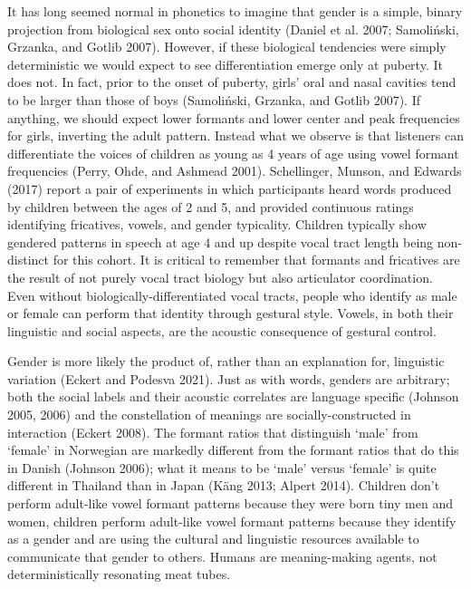 \documentclass[
  letterpaper,
  DIV=11,
  numbers=noendperiod]{scrartcl}
\begin{document}
It has long seemed normal in phonetics to imagine that gender is a
simple, binary projection from biological sex onto social identity
(Daniel et al. 2007; Samoliński, Grzanka, and Gotlib 2007). However, if
these biological tendencies were simply deterministic we would expect to
see differentiation emerge only at puberty. It does not. In fact, prior
to the onset of puberty, girls' oral and nasal cavities tend to be
larger than those of boys (Samoliński, Grzanka, and Gotlib 2007). If
anything, we should expect lower formants and lower center and peak
frequencies for girls, inverting the adult pattern. Instead what we
observe is that listeners can differentiate the voices of children as
young as 4 years of age using vowel formant frequencies (Perry, Ohde,
and Ashmead 2001). Schellinger, Munson, and Edwards (2017) report a pair
of experiments in which participants heard words produced by children
between the ages of 2 and 5, and provided continuous ratings identifying
fricatives, vowels, and gender typicality. Children typically show
gendered patterns in speech at age 4 and up despite vocal tract length
being non-distinct for this cohort. It is critical to remember that
formants and fricatives are the result of not purely vocal tract biology
but also articulator coordination. Even without
biologically-differentiated vocal tracts, people who identify as male or
female can perform that identity through gestural style. Vowels, in both
their linguistic and social aspects, are the acoustic consequence of
gestural control.

Gender is more likely the product of, rather than an explanation for,
linguistic variation (Eckert and Podesva 2021). Just as with words,
genders are arbitrary; both the social labels and their acoustic
correlates are language specific (Johnson 2005, 2006) and the
constellation of meanings are socially-constructed in interaction
(Eckert 2008). The formant ratios that distinguish `male' from `female'
in Norwegian are markedly different from the formant ratios that do this
in Danish (Johnson 2006); what it means to be `male' versus `female' is
quite different in Thailand than in Japan (Käng 2013; Alpert 2014).
Children don't perform adult-like vowel formant patterns because they
were born tiny men and women, children perform adult-like vowel formant
patterns because they identify as a gender and are using the cultural
and linguistic resources available to communicate that gender to others.
Humans are meaning-making agents, not deterministically resonating meat
tubes.
\end{document}
